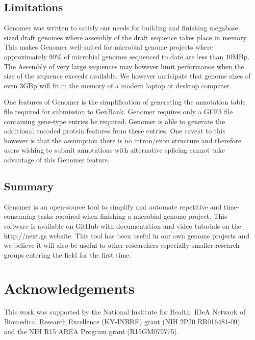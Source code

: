 \documentclass[10pt]{article}
\begin{document}
\subsection*{Limitations}

Genomer was written to satisfy our needs for building and finishing megabase
sized draft genomes where assembly of the draft sequence takes place in memory.
This makes Genomer well-suited for microbial genome projects where
approximately 99\% of microbial genomes sequenced to date are less than 10MBp.
The Assembly of very large sequences may however limit performance when the
size of the sequence exceeds available. We however anticipate that genome sizes
of even 3GBp will fit in the memory of a modern laptop or desktop computer.

One features of Genomer is the simplification of generating the annotation
table file required for submission to GenBank. Genomer requires only a GFF3
file containing gene-type entries be required. Genomer is able to generate the
additional encoded protein features from these entries. One caveat to this
however is that the assumption there is no intron/exon structure and therefore
users wishing to submit annotations with alternative splicing cannot take
advantage of this Genomer feature.

\subsection*{Summary}

Genomer is an open-source tool to simplify and automate repetitive and
time-consuming tasks required when finishing a microbial genome project. This
software is available on GitHub \cite{genomer-github} with documentation and
video tutorials on the http://next.gs website. This tool has been useful in our
own genome projects and we believe it will also be useful to other researchers
especially smaller research groups entering the field for the first time.

\section*{Acknowledgements}

This work was supported by the National Institute for Health: IDeA Network of
Biomedical Research Excellence (KY-INBRE) grant (NIH 2P20 RR016481-09) and the
NIH R15 AREA Program grant (R15GM079775).


\end{document}
